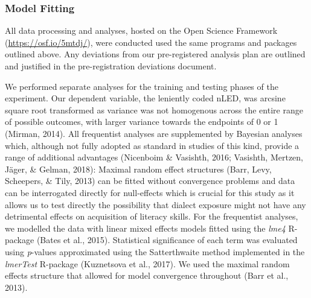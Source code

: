 \documentclass[doc,floatsintext]{apa6}
\begin{document}
\subsubsection{Model Fitting}\label{model-fitting}

All data processing and analyses, hosted on the Open Science Framework
(\url{https://osf.io/5mtdj/}), were conducted used the same programs and
packages outlined above. Any deviations from our pre-registered analysis
plan are outlined and justified in the pre-registration deviations
document.

We performed separate analyses for the training and testing phases of
the experiment. Our dependent variable, the leniently coded nLED, was
arcsine square root transformed as variance was not homogenous across
the entire range of possible outcomes, with larger variance towards the
endpoints of 0 or 1 (Mirman, 2014). All frequentist analyses are
supplemented by Bayesian analyses which, although not fully adopted as
standard in studies of this kind, provide a range of additional
advantages (Nicenboim \& Vasishth, 2016; Vasishth, Mertzen, Jäger, \&
Gelman, 2018): Maximal random effect structures (Barr, Levy, Scheepers,
\& Tily, 2013) can be fitted without convergence problems and data can
be interrogated directly for null-effects which is crucial for this
study as it allows us to test directly the possibility that dialect
exposure might not have any detrimental effects on acquisition of
literacy skills. For the frequentist analyses, we modelled the data with
linear mixed effects models fitted using the \emph{lme4} R-package
(Bates et al., 2015). Statistical significance of each term was
evaluated using \emph{p}-values approximated using the Satterthwaite
method implemented in the \emph{lmerTest} R-package (Kuznetsova et al.,
2017). We used the maximal random effects structure that allowed for
model convergence throughout (Barr et al., 2013).
\end{document}
